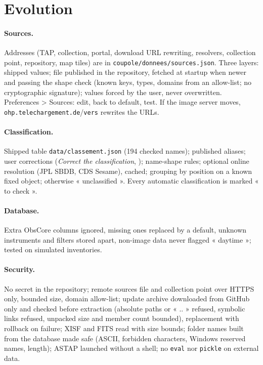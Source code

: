 \section{Evolution}\label{chap:evolutif}
\paragraph{Sources.} Addresses (TAP, collection, portal, download URL rewriting, resolvers, collection point,
repository, map tiles) are in \texttt{coupole/donnees/sources.json}. Three layers: shipped values; file published in
the repository, fetched at startup when newer and passing the shape check (known keys, types, domains from an
allow-list; no cryptographic signature); values forced by the user, never overwritten. Preferences > Sources: edit,
back to default, test. If the image server moves, \texttt{ohp.telechargement.de}/\texttt{vers} rewrites the URLs.
\paragraph{Classification.} Shipped table \texttt{data/classement.json} (194 checked names); published aliases; user
corrections (\emph{Correct the classification}, ); name-shape rules; optional online
resolution (JPL SBDB, CDS Sesame), cached; grouping by position on a known fixed object; otherwise « unclassified ».
Every automatic classification is marked « to check ».
\paragraph{Database.} Extra ObsCore columns ignored, missing ones replaced by a default, unknown instruments and
filters stored apart, non-image data never flagged « daytime »; tested on simulated inventories.
\paragraph{Security.} No secret in the repository; remote sources file and collection point over HTTPS only, bounded
size, domain allow-list; update archive downloaded from GitHub only and checked before extraction (absolute paths or
« .. » refused, symbolic links refused, unpacked size and member count bounded), replacement with rollback on
failure; XISF and FITS read with size bounds; folder names built from the database made safe (ASCII, forbidden
characters, Windows reserved names, length); ASTAP launched without a shell; no \texttt{eval} nor \texttt{pickle}
on external data.

